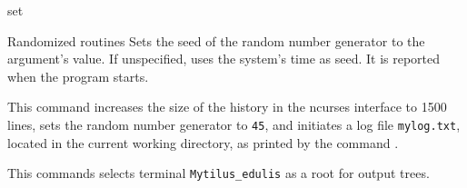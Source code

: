 \begin{command}{set}{}
\begin{arguments}
\begin{argumentgroup}{Randomized routines}
                {Sets the seed of the random number generator to the argument's
                value. If unspecified, \poy uses the system's time as seed. It
                is reported when the program starts.}
                {}

            \end{argumentgroup}
	\end{arguments}


    \begin{poyexamples}
            {This command increases the size of the history in the ncurses
            interface to 1500 lines, sets the random number generator to \texttt{45},
            and initiates a log file \texttt{mylog.txt}, located in the current
            working directory, as printed by the command .}
            
            {This commands selects terminal \texttt{Mytilus\_edulis} as a root
            for output trees.}
            
     \end{poyexamples}
     
	\begin{poyalso}
	\end{poyalso}

\end{command}


